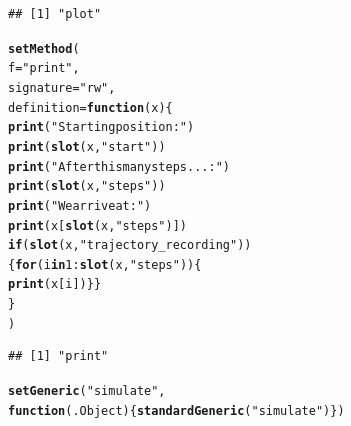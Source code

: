 \documentclass{article}\usepackage[]{graphicx}\usepackage[]{color}
\makeatletter
\newcommand{\hlnum}[1]{\textcolor[rgb]{0.686,0.059,0.569}{#1}}%
\newcommand{\hlstr}[1]{\textcolor[rgb]{0.192,0.494,0.8}{#1}}%
\newcommand{\hlopt}[1]{\textcolor[rgb]{0,0,0}{#1}}%
\newcommand{\hlstd}[1]{\textcolor[rgb]{0.345,0.345,0.345}{#1}}%
\newcommand{\hlkwa}[1]{\textcolor[rgb]{0.161,0.373,0.58}{\textbf{#1}}}%
\newcommand{\hlkwc}[1]{\textcolor[rgb]{0.333,0.667,0.333}{#1}}%
\newcommand{\hlkwd}[1]{\textcolor[rgb]{0.737,0.353,0.396}{\textbf{#1}}}%
\newenvironment{kframe}{%
 \def\at@end@of@kframe{}%
 \ifinner\ifhmode%
  \def\at@end@of@kframe{\end{minipage}}%
  \begin{minipage}{\columnwidth}%
 \fi\fi%
 \def\FrameCommand##1{\hskip\@totalleftmargin \hskip-\fboxsep
 \colorbox{shadecolor}{##1}\hskip-\fboxsep
     \hskip-\linewidth \hskip-\@totalleftmargin \hskip\columnwidth}%
 \MakeFramed {\advance\hsize-\width
   \@totalleftmargin\z@ \linewidth\hsize
   \@setminipage}}%
 {\par\unskip\endMakeFramed%
 \at@end@of@kframe}
\newenvironment{knitrout}{}{} %
\makeatother
\begin{document}
\begin{knitrout}
\begin{kframe}
{\ttfamily\noindent\itshape\color{messagecolor}{\#\# Creating a generic function for 'plot' from package 'graphics' in the global environment}}\begin{verbatim}
## [1] "plot"
\end{verbatim}
\begin{alltt}
\hlkwd{setMethod}\hlstd{(}
  \hlkwc{f}\hlstd{=}\hlstr{"print"}\hlstd{,}
  \hlkwc{signature}\hlstd{=}\hlstr{"rw"}\hlstd{,}
  \hlkwc{definition}\hlstd{=}\hlkwa{function}\hlstd{(}\hlkwc{x}\hlstd{)\{}
    \hlkwd{print}\hlstd{(}\hlstr{"Starting position:"}\hlstd{)}
    \hlkwd{print}\hlstd{(}\hlkwd{slot}\hlstd{(x,}\hlstr{"start"}\hlstd{))}
    \hlkwd{print}\hlstd{(}\hlstr{"After this many steps...:"}\hlstd{)}
    \hlkwd{print}\hlstd{(}\hlkwd{slot}\hlstd{(x,}\hlstr{"steps"}\hlstd{))}
    \hlkwd{print}\hlstd{(}\hlstr{"We arrive at:"}\hlstd{)}
    \hlkwd{print}\hlstd{(x[}\hlkwd{slot}\hlstd{(x,}\hlstr{"steps"}\hlstd{)])}
    \hlkwa{if} \hlstd{(}\hlkwd{slot}\hlstd{(x,}\hlstr{"trajectory_recording"}\hlstd{))}
    \hlstd{\{} \hlkwa{for} \hlstd{(i} \hlkwa{in} \hlnum{1}\hlopt{:}\hlkwd{slot}\hlstd{(x,}\hlstr{"steps"}\hlstd{)) \{}
        \hlkwd{print}\hlstd{(x[i]) \}\}}
  \hlstd{\}}
\hlstd{)}
\end{alltt}


{\ttfamily\noindent\itshape\color{messagecolor}{\#\# Creating a generic function for 'print' from package 'base' in the global environment}}\begin{verbatim}
## [1] "print"
\end{verbatim}
\begin{alltt}
\hlkwd{setGeneric}\hlstd{(}\hlstr{"simulate"}\hlstd{,}
           \hlkwa{function}\hlstd{(}\hlkwc{.Object}\hlstd{)\{}\hlkwd{standardGeneric}\hlstd{(}\hlstr{"simulate"}\hlstd{)\})}
\end{alltt}



\end{kframe}
\end{knitrout}
\end{document}
